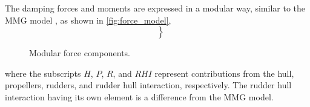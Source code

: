The damping forces and moments are expressed in a modular way, similar to the MMG model \citep{yasukawaIntroductionMMGStandard2015}, as shown in \autoref{fig:force_model},
\begin{equation}
    \label{eq:X_D}
    \left.\begin{aligned}
     \\
     \\
    
    \end{aligned}\right\}
\end{equation}
\begin{figure}[h]
    \centering
    
    \caption{Modular force components.}
    \label{fig:force_model}
\end{figure}
%
%     
%     
where the subscripts $H$, $P$, $R$, and $RHI$ represent contributions from the hull, propellers, rudders, and rudder hull interaction, respectively. The rudder hull interaction having its own element is a difference from the MMG model.